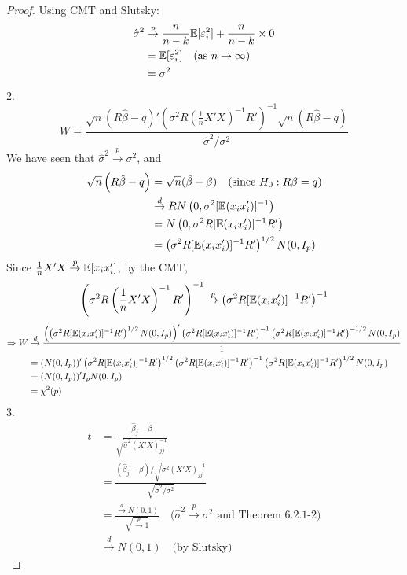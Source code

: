 \documentclass[DIV=14,titlepage=false]{scrreprt}
\begin{document}
\begin{proof}
    Using CMT and Slutsky:
    \begin{align*}
        \hat\sigma^2 &\overset{p}{\to} \frac{n}{n-k} \mathbb{E}[\varepsilon_i^2] + \frac{n}{n-k}\times 0 \\
        &= \mathbb{E}[\varepsilon_i^2] \quad \text{(as } n \to \infty)\\
        &= \sigma^2
    \end{align*}
2.
\[ W= \frac{\sqrt{n}\left(R\hat\beta-q\right)'\left(\sigma^2R\left(\frac{1}{n}X'X\right)^{-1}R'\right)^{-1}\sqrt{n}\left(R\hat\beta-q\right)}{\hat\sigma^2/\sigma^2}\]
We have seen that $\hat\sigma^2 \overset{p}{\to} \sigma^2$, and
\begin{align*}
    \sqrt{n}\left(R\hat\beta-q\right) &= \sqrt{n}(\hat\beta - \beta) \quad \text{(since $H_0:R\beta =q$)}\\
    &\overset{d}{\to} R N\left(0, \sigma^2[\mathbb{E}(x_ix_i')]^{-1}\right)\\
    &= N\left(0, \sigma^2R[\mathbb{E}(x_ix_i')]^{-1}R'\right)\\
    &=\left(\sigma^2R[\mathbb{E}(x_ix_i')]^{-1}R'\right)^{1/2}N(0,I_p)
\end{align*}
Since $\frac{1}{n}X'X \overset{p}{\to}\mathbb{E}[x_ix_i']$, by the CMT,
\[\left(\sigma^2R\left(\frac{1}{n}X'X\right)^{-1}R'\right)^{-1} \overset{p}{\to} \left(\sigma^2R[\mathbb{E}(x_ix_i')]^{-1}R'\right)^{-1}\]
\begin{align*}
    \Rightarrow W &\overset{d}{\to} \frac{\left(\left(\sigma^2R[\mathbb{E}(x_ix_i')]^{-1}R'\right)^{1/2}N(0,I_p)\right)'\left(\sigma^2R[\mathbb{E}(x_ix_i')]^{-1}R'\right)^{-1}\left(\sigma^2R[\mathbb{E}(x_ix_i')]^{-1}R'\right)^{-1/2}N(0,I_p)}{1}\\
    &=(N(0,I_p))'\left(\sigma^2R[\mathbb{E}(x_ix_i')]^{-1}R'\right)^{1/2}\left(\sigma^2R[\mathbb{E}(x_ix_i')]^{-1}R'\right)^{-1}\left(\sigma^2R[\mathbb{E}(x_ix_i')]^{-1}R'\right)^{1/2}N(0,I_p)\\
    &=(N(0,I_p))'I_p N(0,I_p)\\
    &= \chi^2(p)
\end{align*}
3.
\begin{align*}
     t&= \frac{\hat\beta_j-\beta}{\sqrt{\hat\sigma^2 (X' X)^{-1}_{jj}}} \\
     &= \frac{(\hat\beta_j-\beta) / \sqrt{\sigma^2 (X' X)^{-1}_{jj}}}{\sqrt{\hat\sigma^2/{\sigma^2}}}\\
     &= \frac{\overset{d}{\to}N(0,1)}{\sqrt{\overset{p}{\to} 1}}\quad \text{($\hat\sigma^2 \overset{p}{\to} \sigma^2$ and Theorem 6.2.1-2)}\\
     & \overset{d}{\to} N(0,1) \quad \text{(by Slutsky)}
\end{align*}
\end{proof}
\end{document}
